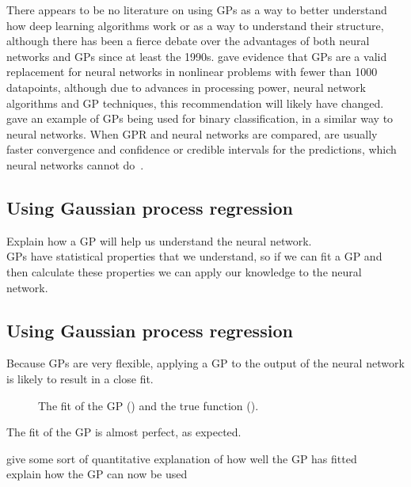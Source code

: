 There appears to be no literature on using \acp{GP} as a way to better understand how deep learning algorithms work or as a way to understand their structure, although there has been a fierce debate over the advantages of both neural networks and \acp{GP} since at least the 1990s.
\textcite[65--66]{rasmussen1997} gave evidence that \acp{GP} are a valid replacement for neural networks in nonlinear problems with fewer than 1000 datapoints, although due to advances in processing power, neural network algorithms and \ac{GP} techniques, this recommendation will likely have changed.
\textcite[25]{mackay1997} gave an example of \acp{GP} being used for binary classification, in a similar way to neural networks.
When \ac{GPR} and neural networks are compared,  are usually faster convergence and confidence or credible intervals for the predictions, which neural networks cannot do~\autocite{herbrich2003}.


\subsection{Using Gaussian process regression}
\begin{todo}
	Explain how a GP will help us understand the neural network. \\
	GPs have statistical properties that we understand, so if we can fit a GP and then calculate these properties we can apply our knowledge to the neural network.
\end{todo}

\subsection{Using Gaussian process regression}

Because \acp{GP} are very flexible, applying a \ac{GP} to the output of the neural network is likely to result in a close fit.

\begin{figure}[htbp]
	\centering
	
	\caption{The fit of the \ac{GP} (\gpcolour) and the true function (\truthcolour).}
	\label{fig:gp-fit}
\end{figure}

The fit of the \ac{GP} is almost perfect, as expected.

\begin{todo}
	give some sort of quantitative explanation of how well the GP has fitted \\
	explain how the GP can now be used
\end{todo}

